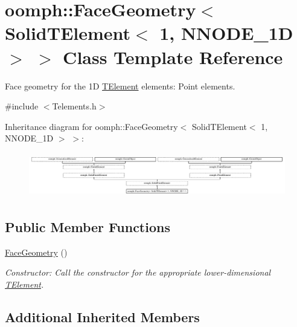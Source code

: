 \hypertarget{classoomph_1_1FaceGeometry_3_01SolidTElement_3_011_00_01NNODE__1D_01_4_01_4}{}\section{oomph\+:\+:Face\+Geometry$<$ Solid\+T\+Element$<$ 1, N\+N\+O\+D\+E\+\_\+1D $>$ $>$ Class Template Reference}
\label{classoomph_1_1FaceGeometry_3_01SolidTElement_3_011_00_01NNODE__1D_01_4_01_4}


Face geometry for the 1D \hyperlink{classoomph_1_1TElement}{T\+Element} elements\+: Point elements.  




{\ttfamily \#include $<$Telements.\+h$>$}

Inheritance diagram for oomph\+:\+:Face\+Geometry$<$ Solid\+T\+Element$<$ 1, N\+N\+O\+D\+E\+\_\+1D $>$ $>$\+:\begin{figure}[H]
\begin{center}
\leavevmode
\includegraphics[height=1.960784cm]{classoomph_1_1FaceGeometry_3_01SolidTElement_3_011_00_01NNODE__1D_01_4_01_4}
\end{center}
\end{figure}
\subsection*{Public Member Functions}
\begin{DoxyCompactItemize}
\item 
\hyperlink{classoomph_1_1FaceGeometry_3_01SolidTElement_3_011_00_01NNODE__1D_01_4_01_4_a1d055bea9a9968dddb59720ec9961425}{Face\+Geometry} ()
\begin{DoxyCompactList}\small\item\em Constructor\+: Call the constructor for the appropriate lower-\/dimensional \hyperlink{classoomph_1_1TElement}{T\+Element}. \end{DoxyCompactList}\end{DoxyCompactItemize}
\subsection*{Additional Inherited Members}


